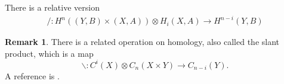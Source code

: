 \documentclass{scrartcl}
\let\emph\relax
\theoremstyle{plain}
\theoremstyle{definition}
\newtheorem{remark}[theorem]{Remark}
\newcommand{\union}{\mathbin{\cup}}
\newcommand{\capp}{\mathbin{\frown}}
\newcommand{\cupp}{\mathbin{\smile}}
\newcommand{\slant}{\mathbin{/}}
\let\xto\xrightarrow
\begin{document}
There is a relative version 
\begin{align*}
    \slant\colon H^n((Y,B)\times (X, A))\otimes H_i(X, A) \to H^{n-i}(Y, B)
\end{align*}



\begin{remark}
    There is a related operation on homology, also called the slant product, which is a map $$\backslash \colon C^i(X) \otimes C_n(X\times Y) \to C_{n-i}(Y).$$ A reference is \cite[VII.11]{dold2012lectures}.
\end{remark}


\end{document}
